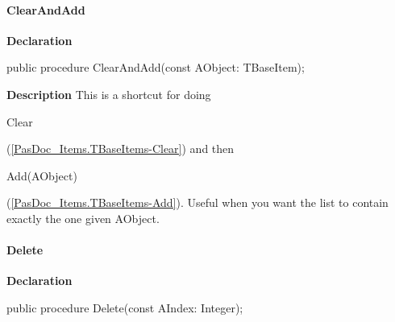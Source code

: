 \documentclass{report}
\newif\ifpdf
\begin{document}
\paragraph*{ClearAndAdd}\hspace*{\fill}

\label{PasDoc_Items.TBaseItems-ClearAndAdd}
\begin{list}{}{
\setlength{\itemindent}{0cm}
\setlength{\listparindent}{0cm}
\setlength{\leftmargin}{\evensidemargin}
\addtolength{\leftmargin}{\tmplength}
\settowidth{\labelsep}{X}
\addtolength{\leftmargin}{\labelsep}
\setlength{\labelwidth}{\tmplength}
}
\item[\textbf{Declaration}\hfill]
\ifpdf
\begin{flushleft}
\fi
\begin{ttfamily}
public procedure ClearAndAdd(const AObject: TBaseItem);\end{ttfamily}

\ifpdf
\end{flushleft}
\fi

\par
\item[\textbf{Description}]
This is a shortcut for doing \begin{ttfamily}Clear\end{ttfamily}(\ref{PasDoc_Items.TBaseItems-Clear}) and then \begin{ttfamily}Add(AObject)\end{ttfamily}(\ref{PasDoc_Items.TBaseItems-Add}). Useful when you want the list to contain exactly the one given AObject.

\end{list}
\paragraph*{Delete}\hspace*{\fill}

\label{PasDoc_Items.TBaseItems-Delete}
\begin{list}{}{
\setlength{\itemindent}{0cm}
\setlength{\listparindent}{0cm}
\setlength{\leftmargin}{\evensidemargin}
\addtolength{\leftmargin}{\tmplength}
\settowidth{\labelsep}{X}
\addtolength{\leftmargin}{\labelsep}
\setlength{\labelwidth}{\tmplength}
}
\item[\textbf{Declaration}\hfill]
\ifpdf
\begin{flushleft}
\fi
\begin{ttfamily}
public procedure Delete(const AIndex: Integer);\end{ttfamily}

\ifpdf
\end{flushleft}
\fi

\end{list}
\end{document}
